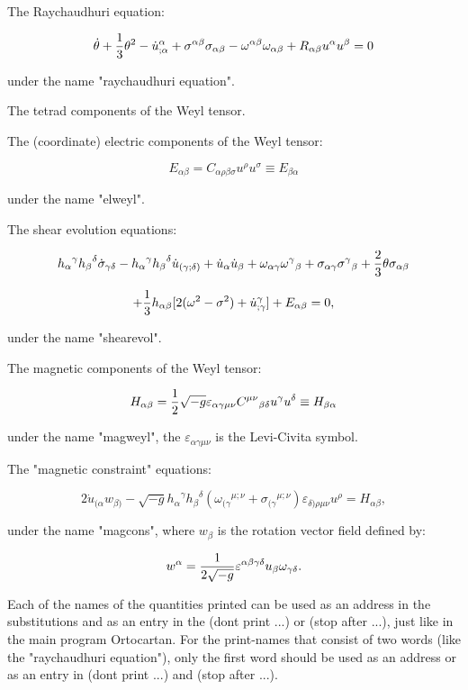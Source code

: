 The Raychaudhuri equation:

$$\dot{\theta} + {1 \over 3}\theta^2 - {\dot{u}^{\alpha}}_{; \alpha} +
\sigma^{\alpha \beta} \sigma_{\alpha \beta} - \omega^{\alpha \beta}
\omega_{\alpha \beta} + R_{\alpha \beta}u^{\alpha} u^{\beta} = 0 $$

\noindent under the name "raychaudhuri equation".

The tetrad components of the Weyl tensor.

The (coordinate) electric components of the Weyl tensor:

$$E_{\alpha \beta} = C_{\alpha \rho \beta \sigma} u^{\rho} u^{\sigma} \equiv
E_{\beta \alpha} $$

\noindent under the name "elweyl".

The shear evolution equations:

$${h_{\alpha}}^{\gamma} {h_{\beta}}^{\delta}\dot{\sigma}_{\gamma \delta} -
{h_{\alpha}}^{\gamma} {h_{\beta}}^{\delta} \dot{u}_{(\gamma; \delta)} +
\dot{u}_{\alpha} \dot{u}_{\beta} + \omega_{\alpha \gamma}
{\omega^{\gamma}}_{\beta} + \sigma_{\alpha \gamma} {\sigma^{\gamma}}_{\beta} +
{2 \over 3} \theta \sigma_{\alpha \beta} $$

$$+ {1 \over 3} h_{\alpha \beta}[2(\omega^2 - \sigma^2) +
{{\dot{u}^{\gamma}}}_{; \gamma}] + E_{\alpha \beta} = 0, $$

\noindent under the name "shearevol".

The magnetic components of the Weyl tensor:

$$ H_{\alpha \beta} = {1 \over 2} {\sqrt {- g}}\varepsilon_{\alpha \gamma \mu
\nu} {C^{\mu \nu}}_{\beta \delta} u^{\gamma} u^{\delta} \equiv H_{\beta \alpha}
$$

\noindent under the name "magweyl", the $\varepsilon_{\alpha \gamma \mu \nu}$
is the Levi-Civita symbol.

The "magnetic constraint" equations:

$$ 2\dot{u}_{(\alpha}w_{\beta)} - {\sqrt {- g}}{h_{\alpha}}^{\gamma}
{h_{\beta}}^{\delta} ({\omega_{(\gamma}}^{\mu ; \nu} + {\sigma_{(\gamma}}^{\mu
; \nu})\varepsilon_{\delta) \rho \mu \nu} u^{\rho} = H_{\alpha \beta}, $$

\noindent under the name "magcons", where $w_{\beta}$ is the rotation vector
field defined by:

$$w^{\alpha} = {1 \over {2 \sqrt{- g}}} \varepsilon^{\alpha \beta \gamma
\delta} u_{\beta} \omega_{\gamma \delta}. $$

Each of the names of the quantities printed can be used as an address in the
substitutions and as an entry in the (dont print ...) or (stop after ...), just
like in the main program Ortocartan. For the print-names that consist of two
words (like the "raychaudhuri equation"), only the first word should be used as
an address or as an entry in (dont print ...) and (stop after ...).

